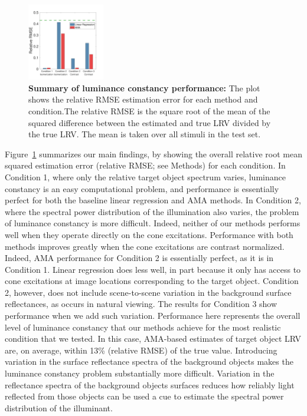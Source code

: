 \documentclass{jov}
\begin{document}
\begin{figure}
\centering
\includegraphics[width=0.3\textwidth]{../FiguresDraft5/Figure13/Figure13_a.pdf}
\caption{{\bf Summary of luminance constancy performance:} The plot shows the relative RMSE estimation error for each method and condition.The relative RMSE is the square root of the mean of the squared difference between the estimated and true LRV divided by the true LRV. The mean is taken over all stimuli in the test set.}
 \label{fig:barGraphs}
\end{figure}

Figure~\ref{fig:barGraphs} summarizes our main findings, by showing the overall relative root mean squared estimation error (relative RMSE; see Methods) for each condition. 
In Condition 1, where only the relative target object spectrum varies, luminance constancy is an easy computational problem,
and performance is essentially perfect for both the baseline linear regression and AMA methods.
In Condition 2, where the spectral power distribution of the illumination also varies, the problem of luminance constancy is more difficult.
Indeed, neither of our methods performs well when they operate directly on the cone excitations.
Performance with both methods improves greatly when the cone excitations are contrast normalized. 
Indeed, AMA performance for Condition 2 is essentially perfect, as it is in Condition 1.
Linear regression does less well, in part because it only has access to cone excitations at image locations
corresponding to the target object.
Condition 2, however, does not include scene-to-scene variation in the background surface reflectances,
as occurs in natural viewing.
The results for Condition 3 show performance when we add such variation.
Performance here represents the overall level of luminance constancy that our methods achieve for the
most realistic condition that we tested.
In this case, AMA-based estimates of target object LRV are, on average, within 13\% (relative RMSE) of the true value.
Introducing variation in the surface reflectance spectra of the background objects makes the luminance constancy problem substantially more difficult. 
Variation in the reflectance spectra of the background objects surfaces reduces how reliably light reflected from those objects can be used a cue to estimate the spectral power distribution of the illuminant.
\end{document}
